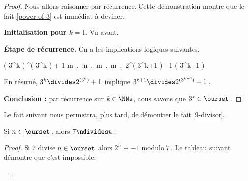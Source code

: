 \begin{proof}
	Nous allons raisonner par récurrence. Cette démonstration montre que le fait \ref{power-of-3} est immédiat à deviner.
    
    \medskip
    
    \textbf{Initialisation pour $k = 1$.}    
    Vu avant.
    
    
    \medskip
    
    \textbf{Étape de récurrence.}    
    On a les implications logiques suivantes.
    
    \medskip
    
    \begin{stepcalc}[style=ar*, ope=\implies]
    	( 3^k ) ^{( 3^k )} + 1
    \explnext{}
    	\exists m \in \ZZ \,.\, \Big[ 2^{( 3^k )} + 1 = m \cdot 3^k  \Big]
    \explnext{}
    	\exists m \in \ZZ \,.\, \Big[ 2^{( 3^k )} = - 1 + m \cdot 3^k  \Big]
    \explnext{}
    	\exists m \in \ZZ \,.\, \Big[ \big( 2^{( 3^k )} \big)^3 = \big( - 1 + m \cdot 3^k \big)^3  \Big]
    \explnext{}
    	\exists m \in \ZZ \,.\, \Big[ 2^{( 3^{k+1} )} = - 1 + 3 \cdot m \cdot 3^k - 3 \cdot \big( m \cdot 3^k \big)^2 + \big( m \cdot 3^k \big)^3  \Big]
    	2^{( 3^{k+1} )} \equiv - 1 \mod\!( 3^{k+1} )
    \end{stepcalc}
    
    \smallskip
    
    En résumé, 
    $3^k \divides 2^{( 3^k )} + 1$ 
    implique
    $3^{k+1} \divides 2^{( 3^{k+1} )} + 1$\,.
    
    \medskip
    
    \textbf{Conclusion :} par récurrence sur $k \in \NNs$, nous savons que $3^k \in \ourset$\,.
\end{proof}




Le fait suivant nous permettra, plus tard, de démontrer le fait \ref{9-divisor}.

\begin{fact} \label{not-7-divisor}
	Si $n \in \ourset$\,, alors $7 \ndivides n$\,.
\end{fact}

\begin{proof}
	Si $7$ divise $n \in \ourset$ alors $2^n \equiv -1$ modulo $7$\,.
	Le tableau suivant démontre que c'est impossible.
	\begin{center}
	\end{center}

    \leavevmode
\end{proof}



